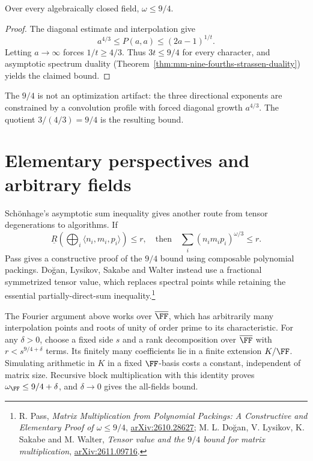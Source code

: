\begin{theorem}
\label{thm:mm-nine-fourths-upper}
Over every algebraically closed field, \(\omega\leq9/4\).
\end{theorem}
\begin{proof}
The diagonal estimate and interpolation give
\[
 a^{4/3}\leq P(a,a)\leq(2a-1)^{1/t}.
\]
Letting \(a\to\infty\) forces \(1/t\geq4/3\). Thus \(3t\leq9/4\) for every character, and asymptotic spectrum duality (Theorem~\ref{thm:mm-nine-fourths-strassen-duality}) yields the claimed bound.
\end{proof}

\begin{moral}
The \(9/4\) is not an optimization artifact: the three directional exponents are constrained by a convolution profile with forced diagonal growth \(a^{4/3}\). The quotient \(3/(4/3)=9/4\) is the resulting bound.
\end{moral}

\section{Elementary perspectives and arbitrary fields}

Sch\"onhage's asymptotic sum inequality gives another route from tensor degenerations to algorithms. If
\[
 \underline R\left(\bigoplus_i\langle n_i,m_i,p_i\rangle\right)\leq r,
 \quad\text{then}\quad \sum_i(n_i m_i p_i)^{\omega/3}\leq r.
\]
Pass gives a constructive proof of the \(9/4\) bound using composable polynomial packings. Do\u{g}an, Lysikov, Sakabe and Walter instead use a fractional symmetrized tensor value, which replaces spectral points while retaining the essential partially-direct-sum inequality.\footnote{R. Pass, \emph{Matrix Multiplication from Polynomial Packings: A Constructive and Elementary Proof of \(\omega\leq9/4\)}, \href{https://arxiv.org/abs/2610.28627}{arXiv:2610.28627}; M. L. Do\u{g}an, V. Lysikov, K. Sakabe and M. Walter, \emph{Tensor value and the \(9/4\) bound for matrix multiplication}, \href{https://arxiv.org/abs/2611.09716}{arXiv:2611.09716}.}

The Fourier argument above works over \(\overline{\FF}\), which has arbitrarily many interpolation points and roots of unity of order prime to its characteristic. For any \(\delta>0\), choose a fixed side \(s\) and a rank decomposition over \(\overline{\FF}\) with \(r<s^{9/4+\delta}\) terms. Its finitely many coefficients lie in a finite extension \(K/\FF\). Simulating arithmetic in \(K\) in a fixed \(\FF\)-basis costs a constant, independent of matrix size. Recursive block multiplication with this identity proves \(\omega_\FF\leq9/4+\delta\), and \(\delta\to0\) gives the all-fields bound.

